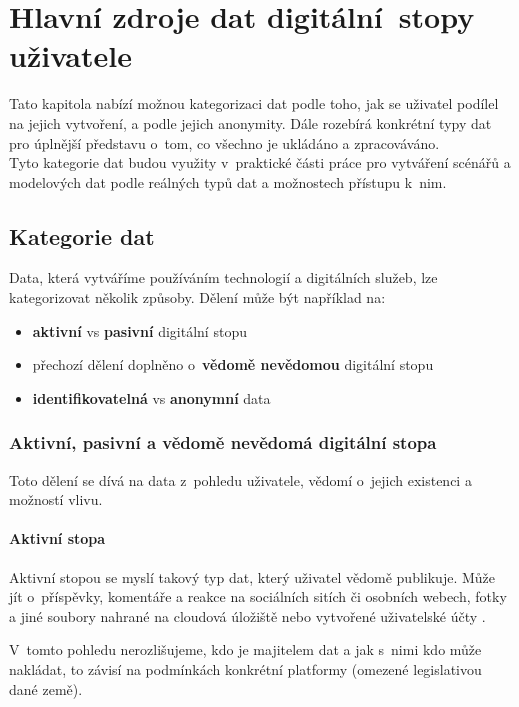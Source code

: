 \chapter{Hlavní zdroje dat digitální~stopy\\ uživatele}

Tato kapitola nabízí možnou kategorizaci dat podle toho, jak se uživatel podílel na jejich vytvoření, a podle jejich anonymity. Dále rozebírá konkrétní typy dat pro úplnější představu o~tom, co všechno je ukládáno a zpracováváno.\\
Tyto kategorie dat budou využity v~praktické části práce pro vytváření scénářů a modelových dat podle reálných typů dat a možnostech přístupu k~nim.

\section{Kategorie dat}
Data, která vytváříme používáním technologií a digitálních služeb, lze kategorizovat několik způsoby. Dělení může být například na:
\begin{itemize}
	\item \textbf{aktivní} vs \textbf{pasivní} digitální stopu \citep{pew-digital-footprint}
    \item přechozí dělení doplněno o~\textbf{vědomě nevědomou} digitální stopu \citep{fish-digital-footprint}
	\item \textbf{identifikovatelná} vs \textbf{anonymní} data
\end{itemize}


\subsection{Aktivní, pasivní a vědomě nevědomá digitální stopa}
Toto dělení se dívá na data z~pohledu uživatele, vědomí o~jejich existenci a možností vlivu. 

\subsubsection*{Aktivní stopa}
Aktivní stopou se myslí takový typ dat, který uživatel vědomě publikuje. Může jít o~příspěvky, komentáře a reakce na sociálních sitích či osobních webech, fotky a jiné soubory nahrané na cloudová úložiště nebo vytvořené uživatelské účty \citep{pew-digital-footprint}.

V~tomto pohledu nerozlišujeme, kdo je majitelem dat a jak s~nimi kdo může nakládat, to závisí na podmínkách konkrétní platformy (omezené legislativou dané země).

